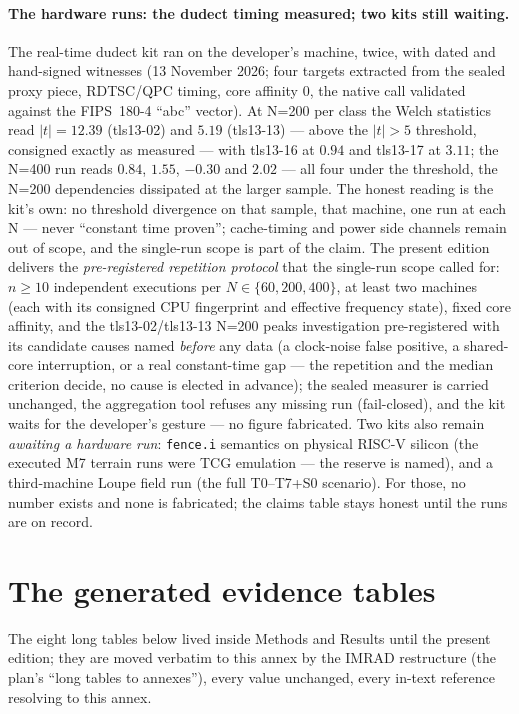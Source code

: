 \documentclass[10pt,a4paper]{article}
\newcommand{\code}[1]{\texttt{\small #1}}
\begin{document}
\paragraph{The hardware runs: the dudect timing measured; two kits still
waiting.} The real-time dudect kit ran on the developer's machine,
twice, with dated and hand-signed witnesses (13 November 2026; four
targets extracted from the sealed proxy piece, RDTSC/QPC timing, core
affinity 0, the native call validated against the FIPS~180-4 ``abc''
vector). At N=200 per class the Welch statistics read $|t| = 12.39$
(tls13-02) and $5.19$ (tls13-13) --- above the $|t|>5$ threshold,
consigned exactly as measured --- with tls13-16 at $0.94$ and tls13-17
at $3.11$; the N=400 run reads $0.84$, $1.55$, $-0.30$ and $2.02$ ---
all four under the threshold, the N=200 dependencies dissipated at the
larger sample. The honest reading is the kit's own: no threshold
divergence on that sample, that machine, one run at each N --- never
``constant time proven''; cache-timing and power side channels remain
out of scope, and the single-run scope is part of the claim. The present edition
delivers the \emph{pre-registered repetition protocol} that the
single-run scope called for: $n{\ge}10$ independent executions per
$N{\in}\{60, 200, 400\}$, at least two machines (each with its
consigned CPU fingerprint and effective frequency state), fixed core
affinity, and the tls13-02/tls13-13 N=200 peaks investigation
pre-registered with its candidate causes named \emph{before} any data
(a clock-noise false positive, a shared-core interruption, or a real
constant-time gap --- the repetition and the median criterion decide,
no cause is elected in advance); the sealed measurer is carried
unchanged, the aggregation tool refuses any missing run (fail-closed),
and the kit waits for the developer's gesture --- no figure fabricated.
Two kits also remain \emph{awaiting a hardware run}:
\code{fence.i} semantics on physical RISC-V silicon (the executed M7
terrain runs were TCG emulation --- the reserve is named), and a
third-machine Loupe field run (the full T0--T7+S0 scenario). For
those, no number exists and none is fabricated; the claims table stays
honest until the runs are on record.

\section{The generated evidence tables}\label{sec:tables-annexe}
The eight long tables below lived inside Methods and Results until the
present edition; they are moved verbatim to this annex by the IMRAD
restructure (the plan's ``long tables to annexes''), every value
unchanged, every in-text reference resolving to this annex.
\end{document}
